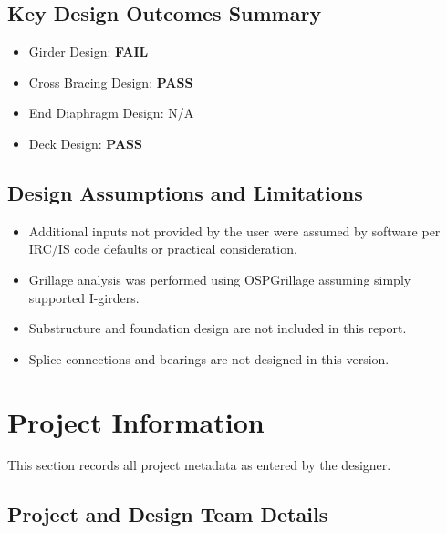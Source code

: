 \documentclass[12pt,a4paper]{report}
\numberwithin{table}{chapter}
\numberwithin{figure}{chapter}
\begin{document}
\vspace{1em}

\section*{Key Design Outcomes Summary}
\label{sec:key-outcomes}

\noindent\begin{itemize}[leftmargin=1.5em]
\item Girder Design: \textcolor{OsdagFail}{\textbf{FAIL}}
\item Cross Bracing Design: \textcolor{OsdagPass}{\textbf{PASS}}
\item End Diaphragm Design: N/A
\item Deck Design: \textcolor{OsdagPass}{\textbf{PASS}}
\end{itemize}

\section*{Design Assumptions and Limitations}
\label{sec:exec-assumptions}

\begin{itemize}
\item Additional inputs not provided by the user were assumed by software per IRC/IS code defaults or practical consideration.
\item Grillage analysis was performed using OSPGrillage assuming simply supported I-girders.
\item Substructure and foundation design are not included in this report.
\item Splice connections and bearings are not designed in this version.
\end{itemize}


\chapter{Project Information}

This section records all project metadata as entered by the designer.

\section{Project and Design Team Details}
\label{sec:project-details}
\end{document}
